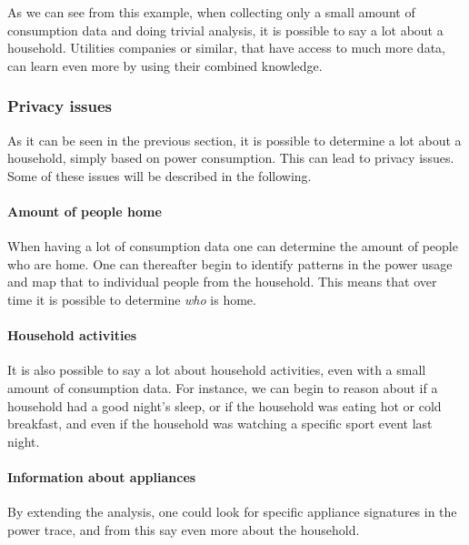 As we can see from this example, when collecting only a small amount of consumption data and doing trivial analysis, it is possible to say a lot about a household.
Utilities companies or similar, that have access to much more data, can learn even more by using their combined knowledge.

\subsubsection{Privacy issues}\label{privacy_concerns}
As it can be seen in the previous section, it is possible to determine a lot about a household, simply based on power consumption.
This can lead to privacy issues. 
Some of these issues will be described in the following.

\paragraph{Amount of people home}
When having a lot of consumption data one can determine the amount of people who are home.
One can thereafter begin to identify patterns in the power usage and map that to individual people from the household.
This means that over time it is possible to determine \textit{who} is home.

\paragraph{Household activities}
  
It is also possible to say a lot about household activities, even with a small amount of consumption data.
For instance, we can begin to reason about if a household had a good night's sleep, or if the household was eating hot or cold breakfast, and even if the household was watching a specific sport event last night.
\paragraph{Information about appliances}
By extending the analysis, one could look for specific appliance signatures in the power trace, and from this say even more about the household.



